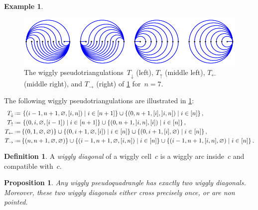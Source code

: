 \documentclass{amsart}
\newtheorem{proposition}[theorem]{Proposition}
\theoremstyle{definition}
\newtheorem{definition}[theorem]{Definition}
\newtheorem{example}[theorem]{Example}
\newcommand{\set}[2]{\left\{ #1 \;\middle|\; #2 \right\}} %
\newcommand{\eqdef}{\mbox{\,\raisebox{0.2ex}{\scriptsize\ensuremath{\mathrm:}}\ensuremath{=}\,}} %
\newcommand{\darkblue}{\color{darkblue}} %
\newcommand{\defn}[1]{\textsl{\darkblue #1}} %
\begin{document}
\begin{example}
\label{exm:specialWigglyPseudotriangulations}
\begin{figure}
\centerline{\includegraphics[scale=1.3]{specialWigglyPseudotriangulations}}
\caption{The wiggly pseudotriangulations~$T_\downarrow$ (left), $T_\uparrow$ (middle left), $T_\leftarrow$ (middle right), and $T_\rightarrow$ (right) of \cref{exm:specialWigglyPseudotriangulations} for~$n = 7$.}
\label{fig:specialWigglyPseudotriangulations}
\end{figure}
The following wiggly pseudotriangulations are illustrated in \cref{fig:specialWigglyPseudotriangulations}:
\begin{align*}
T_\downarrow & \eqdef \set{(i-1, n+1, \varnothing, {[i,n]})}{i \in [n+1]} \cup \set{(0, n+1, [i], {]i,n]})}{i \in [n]}, \\
T_\uparrow & \eqdef \set{(0, i, \varnothing, {[i-1]})}{i \in [n+1]} \cup \set{(0, n+1, {]i,n]}, [i])}{i \in [n]}, \\
T_\leftarrow & \eqdef \{(0, 1, \varnothing, \varnothing)\} \cup \set{(0, i+1, \varnothing, [i])}{i \in [n]} \cup \set{(0, i+1, [i], \varnothing)}{i \in [n]}, \\
T_\rightarrow & \eqdef \{(n, n+1, \varnothing, \varnothing)\} \cup \set{(i-1, n+1, \varnothing, [i,n])}{i \in [n]} \cup \set{(i-1, n+1, [i,n], \varnothing)}{i \in [n]}.
\end{align*}
\end{example}

\begin{definition}
A \defn{wiggly diagonal} of a wiggly cell~$c$ is a wiggly arc inside~$c$ and compatible with~$c$.
\end{definition}

\begin{proposition}
\label{prop:diagonalsPseudoquadrangle}
Any wiggly pseudoquadrangle has exactly two wiggly diagonals.
Moreover, these two wiggly diagonals either cross precisely once, or are non pointed.
\end{proposition}
\end{document}
